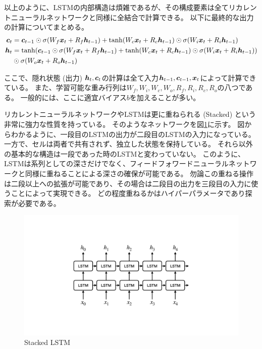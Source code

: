 以上のように、LSTMの内部構造は煩雑であるが、その構成要素は全てリカレントニューラルネットワークと同様に全結合で計算できる。
以下に最終的な出力の計算についてまとめる。
\begin{equation}
 \begin{split}
  {\mbox{\boldmath{$c$}}}_{t} 
  &= {\mbox{\boldmath{$c$}}}_{t-1} \odot \sigma (W_f {\mbox{\boldmath{$x$}}}_t + R_f {\mbox{\boldmath{$h$}}}_{t-1}) 
  + \tanh (W_c {\mbox{\boldmath{$x$}}}_t + R_c {\mbox{\boldmath{$h$}}}_{t-1}) \odot \sigma (W_i {\mbox{\boldmath{$x$}}}_t + R_i {\mbox{\boldmath{$h$}}}_{t-1})\\
  {\mbox{\boldmath{$h$}}}_{t} 
  &= \tanh({\mbox{\boldmath{$c$}}}_{t-1} \odot \sigma (W_f {\mbox{\boldmath{$x$}}}_t + R_f {\mbox{\boldmath{$h$}}}_{t-1}) 
  + \tanh (W_c {\mbox{\boldmath{$x$}}}_t + R_c {\mbox{\boldmath{$h$}}}_{t-1}) \odot \sigma (W_i {\mbox{\boldmath{$x$}}}_t + R_i {\mbox{\boldmath{$h$}}}_{t-1})) \\
  &\odot \sigma (W_o {\mbox{\boldmath{$x$}}}_t + R_o {\mbox{\boldmath{$h$}}}_{t-1})
 \end{split}
\end{equation}

ここで、隠れ状態 (出力) ${\mbox{\boldmath{$h$}}}_t,{\mbox{\boldmath{$c$}}}_t$の計算は全て入力${\mbox{\boldmath{$h$}}}_{t-1},{\mbox{\boldmath{$c$}}}_{t-1},{\mbox{\boldmath{$x$}}}_t$によって計算できている。
また、学習可能な重み行列は$W_f, W_i, W_c, W_o, R_f, R_i, R_c, R_o$の八つである。
一般的には、ここに適宜バイアス$b$を加えることが多い。

リカレントニューラルネットワークやLSTMは更に重ねられる (Stacked) という非常に強力な性質を持っている。
そのようなネットワークを図\ref{16StackedLSTM}に示す。
図からわかるように、一段目のLSTMの出力が二段目のLSTMの入力になっている。
一方で、セルは両者で共有されず、独立した状態を保持している。
それら以外の基本的な構造は一段であった時のLSTMと変わっていない。
このように、LSTMは系列としての深さだけでなく、フィードフォワードニューラルネットワークと同様に重ねることによる深さの確保が可能である。
勿論この重ねる操作は二段以上への拡張が可能であり、その場合は二段目の出力を三段目の入力に使うことによって実現できる。
どの程度重ねるかはハイパーパラメータであり探索が必要である。

\begin{figure}[h]
 \centering
 \includegraphics[trim = 0 200 0 200, width=1.0\textwidth, clip]{Figure/2DeepLearning/16StackedLSTM.png}
 \caption{Stacked LSTM}
 \label{16StackedLSTM}
\end{figure}

